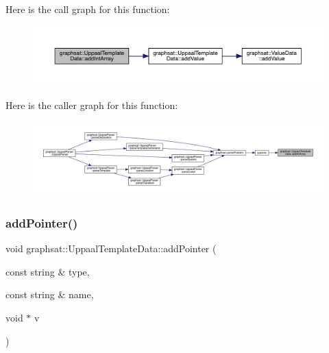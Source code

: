 Here is the call graph for this function\+:
\nopagebreak
\begin{figure}[H]
\begin{center}
\leavevmode
\includegraphics[width=350pt]{classgraphsat_1_1_uppaal_template_data_a109b3e3bd899f1b700cb28253b61f16e_cgraph}
\end{center}
\end{figure}
Here is the caller graph for this function\+:
\nopagebreak
\begin{figure}[H]
\begin{center}
\leavevmode
\includegraphics[width=350pt]{classgraphsat_1_1_uppaal_template_data_a109b3e3bd899f1b700cb28253b61f16e_icgraph}
\end{center}
\end{figure}
\mbox{\label{classgraphsat_1_1_uppaal_template_data_ab6ba35a0dce5f2ac086e11361aafcaec}} 
\subsubsection{\texorpdfstring{addPointer()}{addPointer()}}
{\footnotesize\ttfamily void graphsat\+::\+Uppaal\+Template\+Data\+::add\+Pointer (\begin{DoxyParamCaption}\item[{const string \&}]{type,  }\item[{const string \&}]{name,  }\item[{void $\ast$}]{v }\end{DoxyParamCaption})\hspace{0.3cm}{\ttfamily [inline]}}

